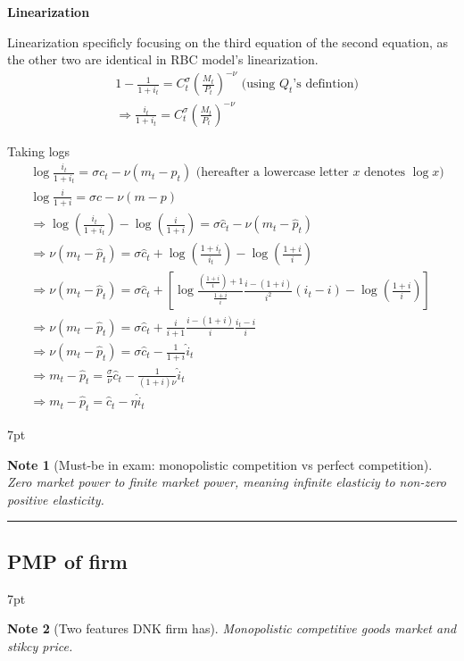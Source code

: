 \documentclass{article}
\newcommand*\sepline{%
  \begin{center}
    \rule[1ex]{.5\textwidth}{.5pt}
  \end{center}}
\newenvironment{blueblock}{
\def\FrameCommand{
  \hspace{1pt}
    {\color{DarkBlue}
    \vrule width 2pt}
    {\color{blueshade}
    \vrule width 4pt}
  \colorbox{blueshade}
}
\MakeFramed{
  \advance
  \hsize-
  \width
  \FrameRestore}
\noindent\hspace{-4.55pt}%
\begin{adjustwidth}{}{7pt}
\vspace{2pt}\vspace{2pt}
}
{\vspace{2pt}\end{adjustwidth}\endMakeFramed}
\newtheorem{note}{Note}
\begin{document}
\textbf{Linearization}

Linearization specificly focusing on the third equation of the second equation, as the other two are identical in RBC model's linearization.
\begin{align}
& 1-\frac{1}{1+i_{t}}=C_{t}^{\sigma}(\frac{M_{t}}{P_{t}})^{-\nu} \text{ (using $Q_t$'s defintion)}
\\&
\Rightarrow \frac{i_{t}}{1+i_{t}}=C_{t}^{\sigma}(\frac{M_{t}}{P_{t}})^{-\nu}
\end{align}

Taking logs
\begin{align}&
\log \frac{i_{t}}{1+i_{t}}=\sigma c_{t}-\nu (m_{t}-p_{t}) \text{ (hereafter a lowercase letter $x$ denotes $\log x$)}
\\&
\log \frac{i}{1+i}=\sigma c-\nu (m-p) 
\\&
\Rightarrow \log(\frac{i_{t}}{1+i_{t}})-\log(\frac{i}{1+i})=\sigma \hat c_{t}-\nu(m_{t}-\hat p_{t})
\\&
\Rightarrow \nu(m_{t}-\hat p_{t})=\sigma \hat c_{t}+\log (\frac{1+i_{t}}{i_{t}})-\log(\frac{1+i}{i})
\\&
\Rightarrow \nu(m_{t}-\hat p_{t})=\sigma \hat c_{t}+[\log \frac{(\frac{1+i}{i})+1}{\frac{1+i}{i}} \frac{i-(1+i)}{i^{2}}(i_{t}-i)-\log(\frac{1+i}{i})]
\\&
\Rightarrow \nu(m_{t}-\hat p_{t})=\sigma \hat c_{t}+ \frac{i}{i+1} \frac{i-(1+i)}{i} \frac{i_{t}-i}{i}
\\&
\Rightarrow \nu(m_{t}-\hat p_{t})=\sigma \hat c_{t}-\frac{1}{1+i}\hat i_{t}
\\&
\Rightarrow m_{t}-\hat p_{t}=\frac{\sigma}{\nu}\hat c_{t}-\frac{1}{(1+i)\nu}\hat i_{t}
\\&
\Rightarrow m_{t}-\hat p_{t}=\hat c_{t}-\eta \hat i_{t}
\end{align}

\begin{blueblock}
\begin{note}[Must-be in exam: monopolistic competition vs perfect competition]
Zero market power to finite market power, meaning infinite elasticiy to non-zero positive elasticity.
\end{note}
\end{blueblock}

\sepline
\subsection{PMP of firm}

\begin{blueblock}
\begin{note}[Two features DNK firm has]
Monopolistic competitive goods market and stikcy price.
\end{note}
\end{blueblock}
\end{document}
